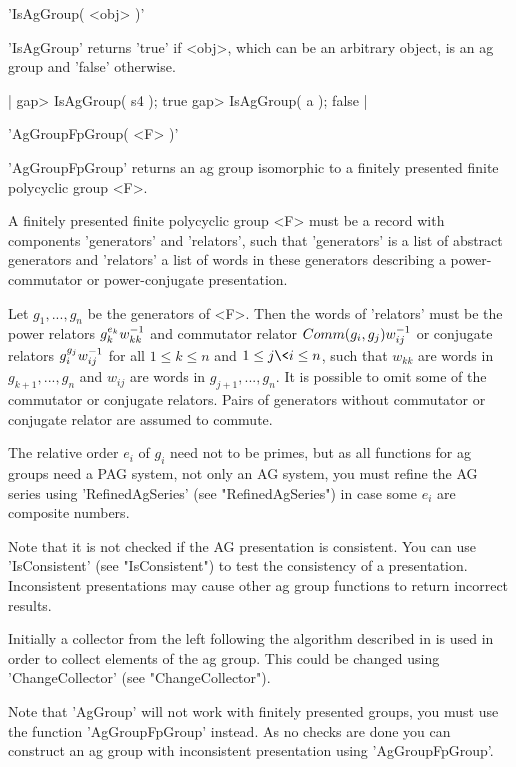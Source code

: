 'IsAgGroup( <obj> )'

'IsAgGroup' returns 'true' if <obj>, which can be an arbitrary object, is
an ag group and 'false' otherwise.

|    gap> IsAgGroup( s4 );
    true
    gap> IsAgGroup( a );
    false |


'AgGroupFpGroup( <F> )'

'AgGroupFpGroup' returns an ag group  isomorphic  to a finitely presented
finite polycyclic group <F>.

A finitely presented  finite polycyclic group <F>  must be a  record with
components 'generators' and 'relators', such that  'generators' is a list
of abstract generators and 'relators' a list of words in these generators
describing a power-commutator or power-conjugate presentation.

Let  $g_1, ..., g_n$   be the generators   of  <F>.  Then   the  words of
'relators' must be the   power relators $g_k^{e_k} \*   w_{kk}^{-1}$  and
commutator relator $Comm(  g_i,   g_j  ) \*  w_{ij}^{-1}$  or   conjugate
relators $g_i^{g_j} \* w_{ij}^{-1}$ for all $1 \leq  k \leq n$ and $1\leq
j \< i \leq n$,  such that $w_{kk}$ are words  in $g_{k+1}, ..., g_n$ and
$w_{ij}$ are words in $g_{j+1}, ..., g_n$.  It  is possible to  omit some
of the  commutator  or conjugate relators.  Pairs   of generators without
commutator or conjugate relator are assumed to commute.

The relative order $e_i$  of $g_i$ need   not  to be  primes, but  as all
functions for  ag groups need a PAG system,  not  only an AG system,  you
must refine the AG series using 'RefinedAgSeries' (see "RefinedAgSeries")
in case some $e_i$ are composite numbers.

Note that it  is not checked if  the AG presentation is  consistent.  You
can use 'IsConsistent' (see "IsConsistent") to  test the consistency of a
presentation.  Inconsistent  presentations   may  cause  other  ag  group
functions to return incorrect results.

Initially  a collector from the left following the algorithm described in
\cite{LS90} is used  in order to collect elements of  the ag group.  This
could be changed using 'ChangeCollector' (see "ChangeCollector").

Note that 'AgGroup' will not  work with  finitely  presented groups,  you
must  use the  function  'AgGroupFpGroup' instead.  As no checks are done
you  can  construct  an ag  group  with inconsistent  presentation  using
'AgGroupFpGroup'.

